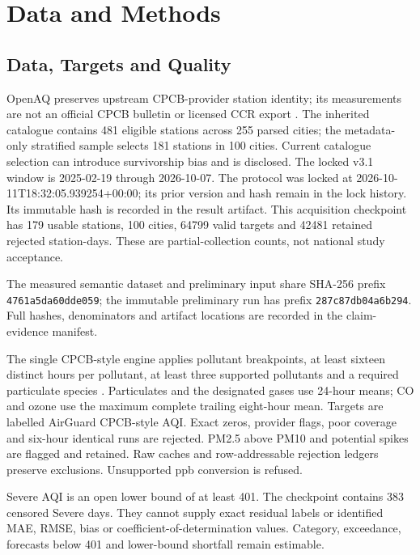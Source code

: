 \section{Data and Methods}
\subsection{Data, Targets and Quality}
OpenAQ preserves upstream CPCB-provider station identity; its measurements are
not an official CPCB bulletin or licensed CCR export \cite{openaq2026}.
The inherited catalogue contains 481 eligible stations across 255 parsed cities;
the metadata-only stratified sample selects 181 stations in 100 cities. Current
catalogue selection can introduce survivorship bias and is disclosed.
The locked v3.1 window is 2025-02-19 through 2026-10-07. The protocol was
locked at 2026-10-11T18:32:05.939254+00:00; its prior version and hash remain in the lock history.
Its immutable hash is recorded in the result artifact. This acquisition checkpoint has
179 usable stations, 100 cities, 64799 valid targets and 42481
retained rejected station-days. These are partial-collection counts, not
national study acceptance.

The measured semantic dataset and preliminary input share SHA-256 prefix \texttt{4761a5da60dde059}; the immutable preliminary run has prefix \texttt{287c87db04a6b294}. Full hashes, denominators and artifact locations are recorded in the claim-evidence manifest.

The single CPCB-style engine applies pollutant breakpoints, at least sixteen
distinct hours per pollutant, at least three supported pollutants and a required
particulate species \cite{cpcb2014aqi}. Particulates and the designated gases use
24-hour means; CO and ozone use the maximum complete trailing eight-hour mean.
Targets are labelled AirGuard CPCB-style AQI. Exact zeros, provider flags, poor
coverage and six-hour identical runs are rejected. PM2.5 above PM10 and potential
spikes are flagged and retained. Raw caches and row-addressable rejection ledgers
preserve exclusions. Unsupported ppb conversion is refused.

Severe AQI is an open lower bound of at least 401. The checkpoint contains
383 censored Severe days. They cannot supply exact residual labels or
identified MAE, RMSE, bias or coefficient-of-determination values. Category,
exceedance, forecasts below 401 and lower-bound shortfall remain estimable.
